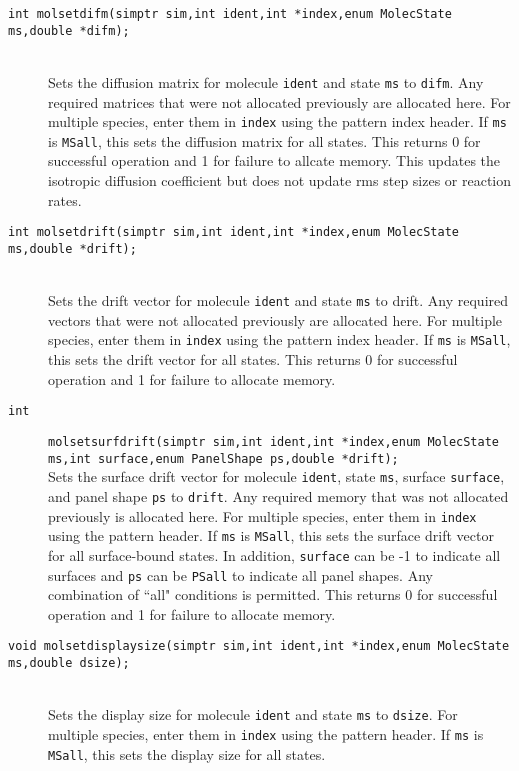 \documentclass {book}
\begin{document}
\begin{description}
\item[\texttt{int molsetdifm(simptr sim,int ident,int *index,enum MolecState ms,double *difm);}]
\hfill \\
Sets the diffusion matrix for molecule \texttt{ident} and state \texttt{ms} to \texttt{difm}.  Any required matrices that were not allocated previously are allocated here.  For multiple species, enter them in \texttt{index} using the pattern index header.  If \texttt{ms} is \texttt{MSall}, this sets the diffusion matrix for all states.  This returns 0 for successful operation and 1 for failure to allcate memory.  This updates the isotropic diffusion coefficient but does not update rms step sizes or reaction rates.

\item[\texttt{int molsetdrift(simptr sim,int ident,int *index,enum MolecState ms,double *drift);}]
\hfill \\
Sets the drift vector for molecule \texttt{ident} and state \texttt{ms} to drift.  Any required vectors that were not allocated previously are allocated here.  For multiple species, enter them in \texttt{index} using the pattern index header.  If \texttt{ms} is \texttt{MSall}, this sets the drift vector for all states.  This returns 0 for successful operation and 1 for failure to allocate memory.

\item[\texttt{int}]
\texttt{molsetsurfdrift(simptr sim,int ident,int *index,enum MolecState ms,int surface,enum PanelShape ps,double *drift);}
\hfill \\
Sets the surface drift vector for molecule \texttt{ident}, state \texttt{ms}, surface \texttt{surface}, and panel shape \texttt{ps} to \texttt{drift}.  Any required memory that was not allocated previously is allocated here.  For multiple species, enter them in \texttt{index} using the pattern header.  If \texttt{ms} is \texttt{MSall}, this sets the surface drift vector for all surface-bound states.  In addition, \texttt{surface} can be -1 to indicate all surfaces and \texttt{ps} can be \texttt{PSall} to indicate all panel shapes.  Any combination of ``all" conditions is permitted.  This returns 0 for successful operation and 1 for failure to allocate memory.

\item[\texttt{void molsetdisplaysize(simptr sim,int ident,int *index,enum MolecState ms,double dsize);}]
\hfill \\
Sets the display size for molecule \texttt{ident} and state \texttt{ms} to \texttt{dsize}.  For multiple species, enter them in \texttt{index} using the pattern header.  If \texttt{ms} is \texttt{MSall}, this sets the display size for all states.


\end{description}
\end{document}
